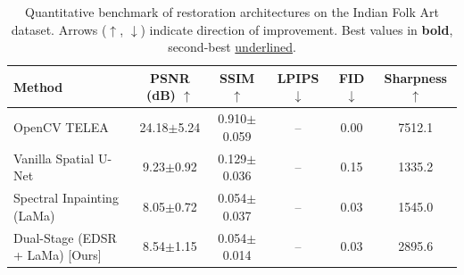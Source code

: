 \begin{table}[t]
\centering
\caption{Quantitative benchmark of restoration architectures on the Indian Folk Art dataset. Arrows ($\uparrow$, $\downarrow$) indicate direction of improvement. Best values in \textbf{bold}, second-best \underline{underlined}.}
\label{tab:quantitative_benchmark}
\begin{tabular}{lccccc}
\toprule
Method & PSNR (dB) $\uparrow$ & SSIM $\uparrow$ & LPIPS $\downarrow$ & FID $\downarrow$ & Sharpness $\uparrow$ \\
\midrule
OpenCV TELEA & 24.18$\pm$5.24 & 0.910$\pm$0.059 & -- & 0.00 & 7512.1 \\
Vanilla Spatial U-Net & 9.23$\pm$0.92 & 0.129$\pm$0.036 & -- & 0.15 & 1335.2 \\
Spectral Inpainting (LaMa) & 8.05$\pm$0.72 & 0.054$\pm$0.037 & -- & 0.03 & 1545.0 \\
Dual-Stage (EDSR + LaMa) [Ours] & 8.54$\pm$1.15 & 0.054$\pm$0.014 & -- & 0.03 & 2895.6 \\
\bottomrule
\end{tabular}
\end{table}
